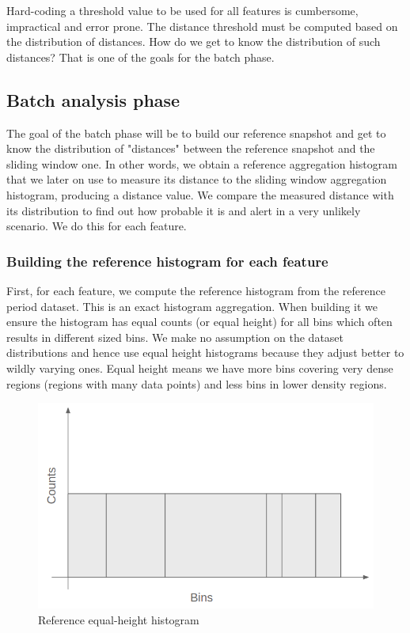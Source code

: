 Hard-coding a threshold value to be used for all features is cumbersome, impractical and error prone. The distance threshold must be computed based on the distribution of distances. How do we get to know the distribution of such distances? That is one of the goals for the batch phase.

\subsection{Batch analysis phase}
The goal of the batch phase will be to build our reference snapshot and get to know the distribution of "distances" between the reference snapshot and the sliding window one. In other words, we obtain a reference aggregation histogram that we later on use to measure its distance to the sliding window aggregation histogram, producing a distance value. We compare the measured distance with its distribution to find out how probable it is and alert in a very unlikely scenario. We do this for each feature.

\subsubsection*{Building the reference histogram for each feature}

First, for each feature, we compute the reference histogram from the reference period dataset. This is an exact histogram aggregation. When building it we ensure the histogram has equal counts (or equal height) for all bins which often results in different sized bins. We make no assumption on the dataset distributions and hence use equal height histograms because they adjust better to wildly varying ones. Equal height means we have more bins covering very dense regions (regions with many data points) and less bins in lower density regions. 

\begin{figure}[!htb]
    \begin{center}
      \includegraphics[scale=0.4]{figures/ref-hist.png}
      \caption[]{Reference equal-height histogram}
      \label{fig:ref-hist}
    \end{center}
\end{figure}


